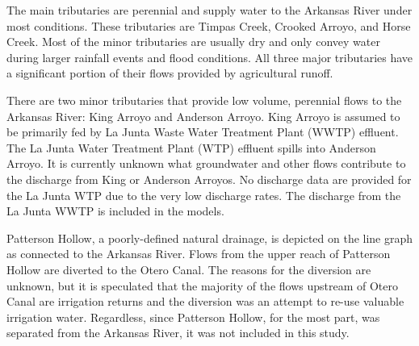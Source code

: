 
The main tributaries are perennial and supply water to the Arkansas River under most conditions.  These tributaries are Timpas Creek, Crooked Arroyo, and Horse Creek.  Most of the minor tributaries are usually dry and only convey water during larger rainfall events and flood conditions.  All three major tributaries have a significant portion of their flows provided by agricultural runoff.

There are two minor tributaries that provide low volume, perennial flows to the Arkansas River: King Arroyo and Anderson Arroyo.  King Arroyo is assumed to be primarily fed by La Junta Waste Water Treatment Plant (WWTP) effluent.  The La Junta Water Treatment Plant (WTP) effluent spills into Anderson Arroyo.  It is currently unknown what groundwater and other flows contribute to the discharge from King or Anderson Arroyos.  No discharge data are provided for the La Junta WTP due to the very low discharge rates.  The discharge from the La Junta WWTP is included in the models.  

Patterson Hollow, a poorly-defined natural drainage, is depicted on the line graph as connected to the Arkansas River.  Flows from the upper reach of Patterson Hollow are diverted to the Otero Canal.  The reasons for the diversion are unknown, but it is speculated that the majority of the flows upstream of Otero Canal are irrigation returns and the diversion was an attempt to re-use valuable irrigation water.  Regardless, since Patterson Hollow, for the most part, was separated from the Arkansas River, it was not included in this study.

